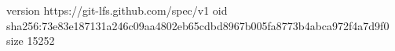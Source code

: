 version https://git-lfs.github.com/spec/v1
oid sha256:73e83e187131a246c09aa4802eb65cdbd8967b005fa8773b4abca972f4a7d9f0
size 15252
